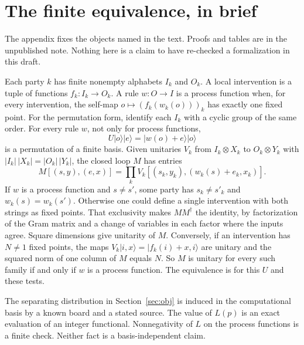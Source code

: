 \documentclass[11pt]{article}
\begin{document}
\appendix
\section{The finite equivalence, in brief}
\label{app}

The appendix fixes the objects named in the text. Proofs and tables are in the unpublished note. Nothing here is a claim to have re-checked a formalization in this draft.

Each party \(k\) has finite nonempty alphabets \(I_k\) and \(O_k\). A local intervention is a tuple of functions \(f_k\colon I_k\to O_k\). A rule \(w\colon O\to I\) is a process function when, for every intervention, the self-map \(o\mapsto (f_k(w_k(o)))_k\) has exactly one fixed point. For the permutation form, identify each \(I_k\) with a cyclic group of the same order. For every rule \(w\), not only for process functions,
\[
U\lvert o\rangle\lvert e\rangle = \lvert w(o)+e\rangle\lvert o\rangle
\]
is a permutation of a finite basis. Given unitaries \(V_k\) from \(I_k\otimes X_k\) to \(O_k\otimes Y_k\) with \(|I_k|\,|X_k|=|O_k|\,|Y_k|\), the closed loop \(M\) has entries
\[
M[(s,y),(e,x)] = \prod_k V_k[(s_k,y_k),(w_k(s)+e_k,x_k)].
\]
If \(w\) is a process function and \(s\neq s'\), some party has \(s_k\neq s'_k\) and \(w_k(s)=w_k(s')\). Otherwise one could define a single intervention with both strings as fixed points. That exclusivity makes \(MM^{\dagger}\) the identity, by factorization of the Gram matrix and a change of variables in each factor where the inputs agree. Square dimensions give unitarity of \(M\). Conversely, if an intervention has \(N\neq 1\) fixed points, the maps \(V_k\lvert i,x\rangle = \lvert f_k(i)+x, i\rangle\) are unitary and the squared norm of one column of \(M\) equals \(N\). So \(M\) is unitary for every such family if and only if \(w\) is a process function. The equivalence is for this \(U\) and these tests.

The separating distribution in Section~\ref{sec:obj} is induced in the computational basis by a known board and a stated source. The value of \(L(p)\) is an exact evaluation of an integer functional. Nonnegativity of \(L\) on the process functions is a finite check. Neither fact is a basis-independent claim.



\end{document}
